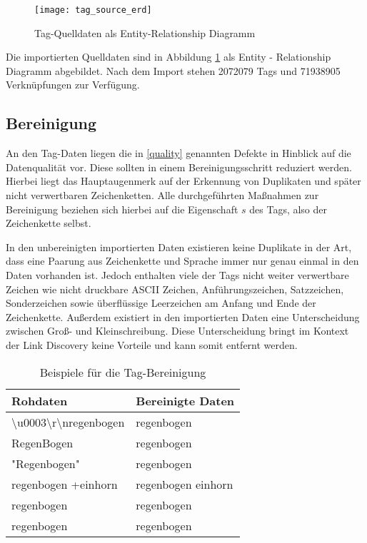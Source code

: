 \begin{figure}
\centering
\texttt{[image: tag\_source\_erd]}
\caption{Tag-Quelldaten als Entity-Relationship Diagramm}
\label{fig:tag_source_erd}
\end{figure}

Die importierten Quelldaten sind in Abbildung \ref{fig:tag_source_erd} als Entity - Relationship Diagramm abgebildet. Nach dem Import stehen \num{2072079} Tags und \num{71938905} Verknüpfungen zur Verfügung.

\subsection{Bereinigung}

An den Tag-Daten liegen die in \ref{quality} genannten Defekte in Hinblick auf die Datenqualität vor. Diese sollten in einem Bereinigungsschritt reduziert werden. Hierbei liegt das Hauptaugenmerk auf der Erkennung von Duplikaten und später nicht verwertbaren Zeichenketten. Alle durchgeführten Maßnahmen zur Bereinigung beziehen sich hierbei auf die Eigenschaft \(s\) des Tags, also der Zeichenkette selbst.

In den unbereinigten importierten Daten existieren keine Duplikate in der Art, dass eine Paarung aus Zeichenkette und Sprache immer nur genau einmal in den Daten vorhanden ist. Jedoch enthalten viele der Tags nicht weiter verwertbare Zeichen wie nicht druckbare ASCII Zeichen, Anführungszeichen, Satzzeichen, Sonderzeichen sowie überflüssige Leerzeichen am Anfang und Ende der Zeichenkette. Außerdem existiert in den importierten Daten eine Unterscheidung zwischen Groß- und Kleinschreibung. Diese Unterscheidung bringt im Kontext der Link Discovery keine Vorteile und kann somit entfernt werden.

\begin{table}
\centering
\begin{tabular}{|l|l|}
    \hline
    Rohdaten & Bereinigte Daten \\
    \hline
    \textbackslash u0003\textbackslash r\textbackslash nregenbogen & regenbogen \\
    RegenBogen & regenbogen \\
    "Regenbogen" & regenbogen \\
    regenbogen +einhorn & regenbogen einhorn\\
    \hspace{10 mm} regenbogen & regenbogen \\
    regenbogen & regenbogen \\
    \hline
\end{tabular}
\caption{Beispiele für die Tag-Bereinigung}
\label{tab:tag_cleaning}
\end{table}

